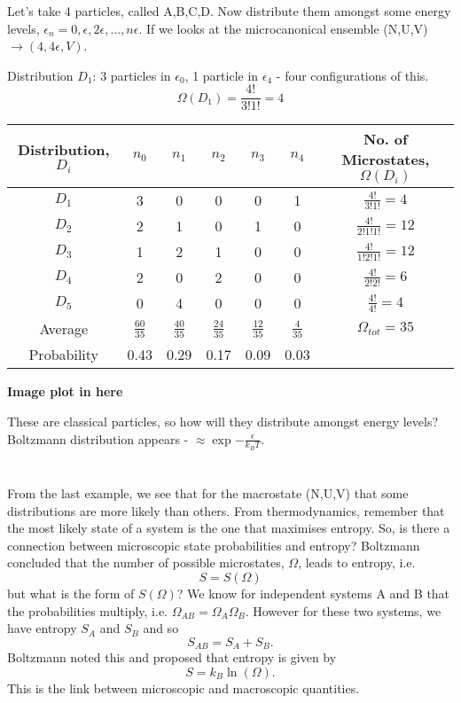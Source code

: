 \documentclass[a4paper, 11pt, normalem]{report}
\newcommand\e{\epsilon}
\begin{document}
\begin{example}
Let's take 4 particles, called A,B,C,D. 
Now distribute them amongst some energy levels, $\e_n = 0, \e, 2\e, \dots, n\e$.
If we looks at the microcanonical ensemble (N,U,V) $\to (4,4\e,V)$.

Distribution $D_1$: 3 particles in $\e_0$, 1 particle in $\e_4$ - four configurations of this.
\begin{equation}
    \Omega(D_1) = \frac{4!}{3!1!} = 4
\end{equation}
\begin{table}[H]
\centering
\begin{tabular}{|c||c|c|c|c|c||c|}
    \hline
    Distribution, $D_i$ & $n_0$ & $n_1$ & $n_2$ & $n_3$ & $n_4$ & No. of Microstates, $\Omega(D_i)$ \\
    \hline
    $D_1$ & 3 & 0 & 0 & 0 & 1 & $\frac{4!}{3!1!} = 4$ \\
    $D_2$ & 2 & 1 & 0 & 1 & 0 & $\frac{4!}{2!1!1!} = 12$ \\
    $D_3$ & 1 & 2 & 1 & 0 & 0 & $\frac{4!}{1!2!1!} = 12$ \\
    $D_4$ & 2 & 0 & 2 & 0 & 0 & $\frac{4!}{2!2!} = 6$ \\
    $D_5$ & 0 & 4 & 0 & 0 & 0 & $\frac{4!}{4!} = 4$ \\
    \hline
    Average & $\frac{60}{35}$ & $\frac{40}{35}$ & $\frac{24}{35}$ & $\frac{12}{35}$ & $\frac{4}{35}$ & $\Omega_{tot} = 35$ \\
    \hline
    Probability & 0.43 & 0.29 & 0.17 & 0.09 & 0.03 & \\
    \hline
\end{tabular}
\end{table}
\textbf{Image plot in here}

These are classical particles, so how will they distribute amongst energy levels? Boltzmann distribution appears - $\approx \exp{-\frac{\e}{k_BT}}$.
\end{example}

\chapter{}
From the last example, we see that for the macrostate (N,U,V) that some distributions are more likely than others. 
From thermodynamics, remember that the most likely state of a system is the one that maximises entropy. 
So, is there a connection between microscopic state probabilities and entropy?
Boltzmann concluded that the number of possible microstates, $\Omega$, leads to entropy, i.e.
\begin{equation}
    S = S(\Omega)
\end{equation}
but what is the form of $S(\Omega)$? 
We know for independent systems A and B that the probabilities multiply, i.e. $\Omega_{AB} = \Omega_A\Omega_B$.
However for these two systems, we have entropy $S_A$ and $S_B$ and so
\begin{equation}
    S_{AB} = S_A + S_B.
\end{equation}
Boltzmann noted this and proposed that entropy is given by
\begin{equation}
    S = k_B\ln(\Omega).
\end{equation}
This is the link between microscopic and macroscopic quantities. 
\end{document}
